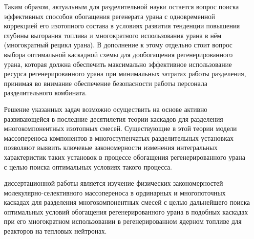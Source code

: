 Таким образом, актуальным для разделительной науки остается вопрос поиска эффективных способов обогащения регенерата урана с одновременной коррекцией его изотопного состава в условиях развития тенденции повышения глубины выгорания топлива и многократного использования урана в нём (многократный рецикл урана). В дополнение к этому отдельно стоит вопрос выбора оптимальной каскадной схемы для дообогащения регенерированного урана, которая должна обеспечить максимально эффективное использование ресурса регенерированного урана при минимальных затратах работы разделения, принимая во внимание обеспечение безопасности работы персонала разделительного комбината.

Решение указанных задач возможно осуществить на основе активно развивающейся в последние десятилетия теории каскадов для разделения многокомпонентных изотопных смесей. Существующие в этой теории модели массопереноса компонентов в многоступенчатых разделительных установках позволяют выявить ключевые закономерности изменения интегральных характеристик таких установок в процессе обогащения регенерированного урана с целью поиска оптимальных условиях такого процесса.
 

{\aim} диссертационной работы является изучение физических закономерностей
молекулярно-селективного массопереноса в ординарных и многопоточных каскадах
для разделения многокомпонентных смесей с целью дальнейшего поиска
оптимальных условий обогащения регенерированного урана в подобных каскадах при
его многократном использовании в регенерированном ядерном топливе для реакторов на тепловых нейтронах. 

